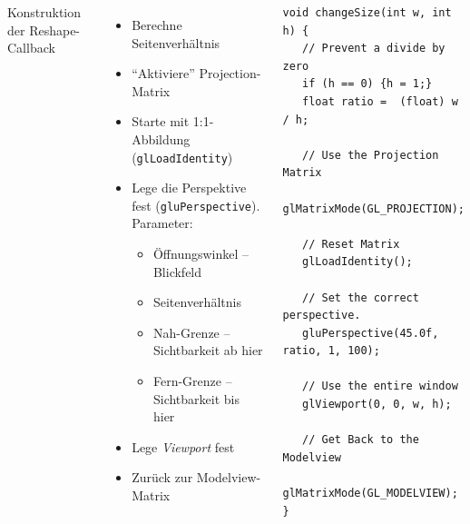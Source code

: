 \begin{frame}[fragile]
%
\begin{columns}[T]
\begin{Large}
{Konstruktion der Reshape-Callback}
\vspace{10pt}
\end{Large}
%
\begin{itemize}
\item Berechne Seitenverhältnis
\item \enquote{Aktiviere} Projection-Matrix
\item Starte mit 1:1-Abbildung (\texttt{glLoadIdentity})
\item Lege die Perspektive fest (\texttt{gluPerspective}). Parameter:
	\begin{itemize}
	\item Öffnungswinkel -- Blickfeld
	\item Seitenverhältnis
	\item Nah-Grenze -- Sichtbarkeit ab hier
	\item Fern-Grenze -- Sichtbarkeit bis hier
	\end{itemize}
\item Lege \emph{Viewport} fest
\item Zurück zur Modelview-Matrix
\end{itemize}
%
\begin{codebox}[Function \texttt{changeSize}, height=7.6cm]
\begin{verbatim}
void changeSize(int w, int h) {
   // Prevent a divide by zero
   if (h == 0) {h = 1;}
   float ratio =  (float) w / h;

   // Use the Projection Matrix
   glMatrixMode(GL_PROJECTION);

   // Reset Matrix
   glLoadIdentity();

   // Set the correct perspective.
   gluPerspective(45.0f, ratio, 1, 100);

   // Use the entire window
   glViewport(0, 0, w, h);

   // Get Back to the Modelview
   glMatrixMode(GL_MODELVIEW);
}
\end{verbatim}
\end{codebox}
\end{columns}
%
\end{frame}


